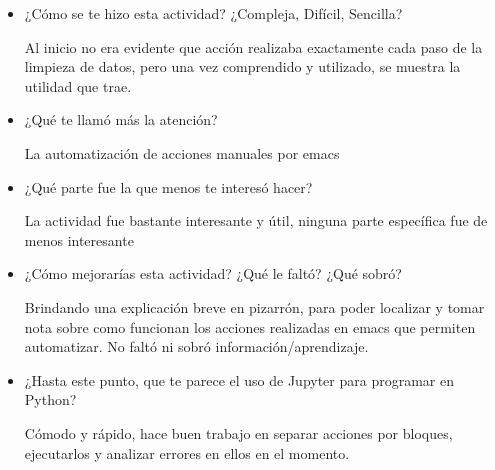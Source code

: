 \documentclass[a4paper]{article}
\begin{document}
\begin{itemize}
	\item     ¿Cómo se te hizo esta actividad? ¿Compleja, Difícil, Sencilla?

Al inicio no era evidente que acción realizaba exactamente cada paso de la limpieza de datos, pero una vez comprendido y utilizado, se muestra la utilidad que trae.

	\item     ¿Qué te llamó más la atención?
    
La automatización de acciones manuales por emacs
    
	\item     ¿Qué parte fue la que menos te interesó hacer?
    
La actividad fue bastante interesante y útil, ninguna parte específica fue de menos interesante
    
	\item     ¿Cómo mejorarías esta actividad? ¿Qué le faltó? ¿Qué sobró?
    
Brindando una explicación breve en pizarrón, para poder localizar y tomar nota sobre como funcionan los acciones realizadas en emacs que permiten automatizar. No faltó ni sobró información/aprendizaje.
    
	\item     ¿Hasta este punto, que te parece el uso de Jupyter para programar en Python? 
    
Cómodo y rápido, hace buen trabajo en separar acciones por bloques, ejecutarlos y analizar errores en ellos en el momento.
    
    
\end{itemize}
\end{document}
